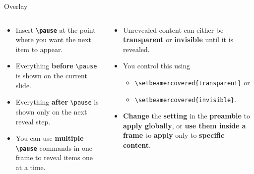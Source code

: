 \documentclass[aspectratio=169]{beamer}
\begin{document}
\begin{frame}{Overlay}
    \pause
    \vspace{-0.5cm}
    \begin{columns}
        \begin{column}{0.49\textwidth}
            \begin{coloredblock}
                \begin{itemize}
                    \item \footnotesize Insert \textbf{\texttt{\textbackslash pause}} at the point where you want the next item to appear.
                    \item \footnotesize Everything \textbf{before} \texttt{\textbackslash pause} is shown on the current slide.
                    \item \footnotesize Everything \textbf{after} \texttt{\textbackslash pause} is shown only on the next reveal step.
                    \item \footnotesize You can use \textbf{multiple \texttt{\textbackslash pause}} commands in one frame to reveal items one at a time.
                \end{itemize}
            \end{coloredblock}
        \end{column}
        \begin{column}{0.49\textwidth}
            \pause
                \begin{coloredblock}
                    \begin{itemize}
                       \item \footnotesize Unrevealed content can either be \textbf{transparent} or \textbf{invisible} until it is revealed.
                        \item \footnotesize You control this using 
                        \vspace{-0.4cm}
                        \begin{itemize}
                            \item \texttt{\textbackslash setbeamercovered\{transparent\}} or
                            \item \texttt{\textbackslash setbeamercovered\{invisible\}}.
                        \end{itemize}
                        \item \footnotesize \textbf{Change} the \textbf{setting} in the \textbf{preamble} to \textbf{apply globally}, or \textbf{use them inside a frame} to \textbf{apply} only to \textbf{specific content}.
                    \end{itemize}
                \end{coloredblock}
            \end{column}
        \end{columns}

\end{frame}
\end{document}
